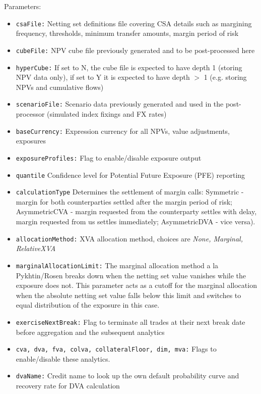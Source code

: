 \documentclass[12pt, a4paper]{article}
\begin{document}
Parameters:
\begin{itemize}
\item {\tt csaFile:} Netting set definitions file covering CSA details such as margining frequency, thresholds, minimum
transfer amounts, margin period of risk
\item {\tt cubeFile:} NPV cube file previously generated and to be post-processed here
\item {\tt hyperCube:} If set to N, the cube file is expected to have depth 1 (storing NPV data only), if set to Y it is
expected to have depth $>$ 1 (e.g. storing NPVs and cumulative flows)
\item {\tt scenarioFile:} Scenario data previously generated and used in the post-processor (simulated index fixings and
FX rates)
\item {\tt baseCurrency:} Expression currency for all NPVs, value adjustments, exposures
\item {\tt exposureProfiles:} Flag to enable/disable exposure output
\item {\tt quantile} Confidence level for Potential Future Exposure (PFE) reporting
\item {\tt calculationType} Determines the settlement of margin calls: Symmetric - margin for both counterparties
settled after the margin period of risk; AsymmetricCVA - margin requested from the counterparty settles with delay,
margin requested from us settles immediately; AsymmetricDVA - vice versa). 
\item {\tt allocationMethod:} XVA allocation method, choices are {\em None, Marginal, RelativeXVA}
\item {\tt marginalAllocationLimit:} The marginal allocation method a la Pykhtin/Rosen breaks down when the netting set
value vanishes while the exposure does not. This parameter acts as a cutoff for the marginal allocation when the
absolute netting set value falls below this limit and switches to equal distribution of the exposure in this case.
\item {\tt exerciseNextBreak:} Flag to terminate all trades at their next break date before aggregation and the
subsequent analytics
\item {\tt cva, dva, fva, colva, collateralFloor, dim, mva:} Flags to enable/disable these analytics. 
\item {\tt dvaName:} Credit name to look up the own default probability curve and recovery rate for DVA calculation

\end{itemize}
\end{document}
